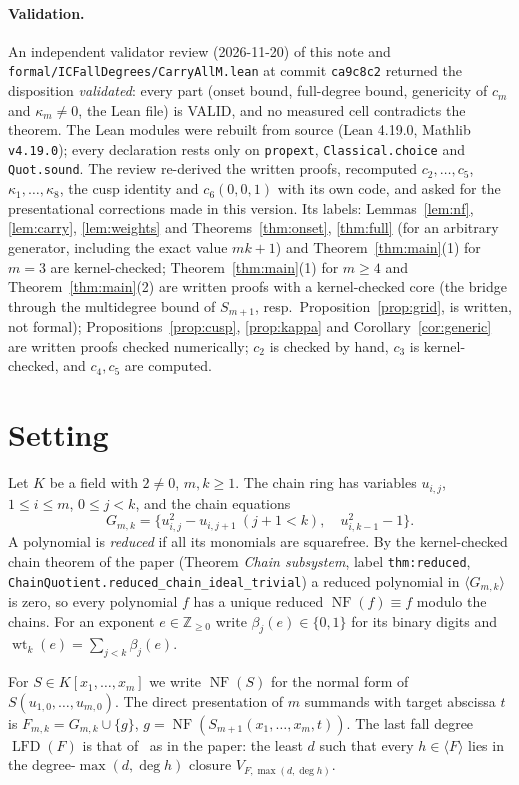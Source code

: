 \documentclass[11pt]{article}
\newcommand{\Z}{\mathbb Z}
\newcommand{\lfd}{\operatorname{LFD}}
\newcommand{\NF}{\operatorname{NF}}
\newcommand{\wt}{\operatorname{wt}}
\newcommand{\code}[1]{\texttt{#1}}
\theoremstyle{definition}
\theoremstyle{remark}
\begin{document}
\paragraph{Validation.} An independent validator review (2026-11-20) of this
note and \code{formal/ICFallDegrees/CarryAllM.lean} at commit \code{ca9c8c2}
returned the disposition \emph{validated}: every part (onset bound,
full-degree bound, genericity of $c_m$ and $\kappa_m\ne0$, the Lean file) is
VALID, and no measured cell contradicts the theorem. The Lean modules were
rebuilt from source (Lean 4.19.0, Mathlib \code{v4.19.0}); every declaration
rests only on \code{propext}, \code{Classical.choice} and \code{Quot.sound}.
The review re-derived the written proofs, recomputed $c_2,\ldots,c_5$,
$\kappa_1,\ldots,\kappa_8$, the cusp identity and $c_6(0,0,1)$ with its own code,
and asked for the presentational corrections made in this version. Its labels:
Lemmas~\ref{lem:nf}, \ref{lem:carry}, \ref{lem:weights} and
Theorems~\ref{thm:onset}, \ref{thm:full} (for an arbitrary generator,
including the exact value $mk+1$) and Theorem~\ref{thm:main}(1) for $m=3$ are
kernel-checked; Theorem~\ref{thm:main}(1) for $m\ge4$ and
Theorem~\ref{thm:main}(2) are written proofs with a kernel-checked core (the
bridge through the multidegree bound of $S_{m+1}$, resp.\
Proposition~\ref{prop:grid}, is written, not formal);
Propositions~\ref{prop:cusp}, \ref{prop:kappa} and Corollary~\ref{cor:generic}
are written proofs checked numerically; $c_2$ is checked by hand, $c_3$ is
kernel-checked, and $c_4,c_5$ are computed.

\section{Setting}
Let $K$ be a field with $2\ne0$, $m,k\ge1$. The chain ring has variables
$u_{i,j}$, $1\le i\le m$, $0\le j<k$, and the chain equations
\[
 G_{m,k}=\{u_{i,j}^2-u_{i,j+1}\ (j+1<k),\quad u_{i,k-1}^2-1\}.
\]
A polynomial is \emph{reduced} if all its monomials are squarefree. By the
kernel-checked chain theorem of the paper (Theorem \emph{Chain subsystem}, label \code{thm:reduced},
\code{ChainQuotient.reduced\_chain\_ideal\_trivial}) a reduced polynomial in
$\langle G_{m,k}\rangle$ is zero, so every polynomial $f$ has a unique reduced
$\NF(f)\equiv f$ modulo the chains. For an exponent $e\in\Z_{\ge0}$ write
$\beta_j(e)\in\{0,1\}$ for its binary digits and
$\wt_k(e)=\sum_{j<k}\beta_j(e)$.

For $S\in K[x_1,\ldots,x_m]$ we write $\NF(S)$ for the normal form of
$S(u_{1,0},\ldots,u_{m,0})$. The direct presentation of $m$ summands with
target abscissa $t$ is $F_{m,k}=G_{m,k}\cup\{g\}$, $g=\NF(S_{m+1}(x_1,\ldots,x_m,t))$.
The last fall degree $\lfd(F)$ is that of~\cite{hkyy} as in the paper:
the least $d$ such that every $h\in\langle F\rangle$ lies in the degree-$\max(d,\deg h)$ closure
$V_{F,\max(d,\deg h)}$.
\end{document}
